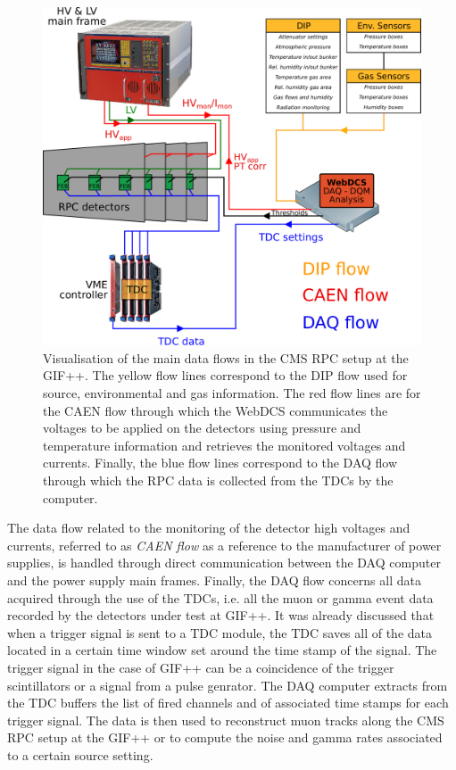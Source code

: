 	\begin{figure}[H]
        \centering
		\includegraphics[width = 0.9\linewidth]{fig/chapt5/GIFpp-setup.pdf}
		\caption{\label{fig:dataflow} Visualisation of the main data flows in the CMS RPC setup at the GIF++. The yellow flow lines correspond to the DIP flow used for source, environmental and gas information. The red flow lines are for the CAEN flow through which the WebDCS communicates the voltages to be applied on the detectors using pressure and temperature information and retrieves the monitored voltages and currents. Finally, the blue flow lines correspond to the DAQ flow through which the RPC data is collected from the TDCs by the computer.}
	\end{figure}
	
	The data flow related to the monitoring of the detector high voltages and currents, referred to as \textit{CAEN flow} as a reference to the manufacturer of power supplies, is handled through direct communication between the DAQ computer and the power supply main frames. Finally, the DAQ flow concerns all data acquired through the use of the TDCs, i.e. all the muon or gamma event data recorded by the detectors under test at GIF++. It was already discussed that when a trigger signal is sent to a TDC module, the TDC saves all of the data located in a certain time window set around the time stamp of the signal. The trigger signal in the case of GIF++ can be a coincidence of the trigger scintillators or a signal from a pulse genrator. The DAQ computer extracts from the TDC buffers the list of fired channels and of associated time stamps for each trigger signal. The data is then used to reconstruct muon tracks along the CMS RPC setup at the GIF++ or to compute the noise and gamma rates associated to a certain source setting.

